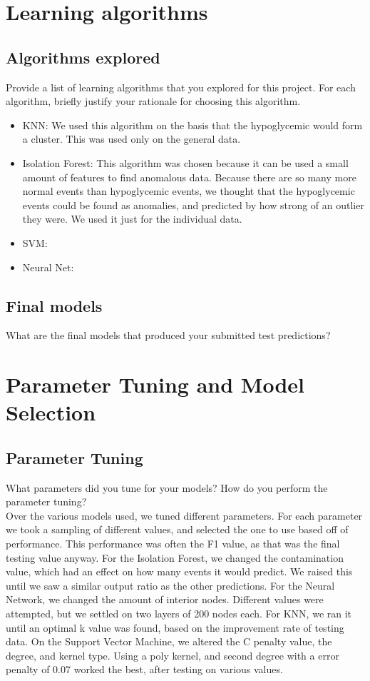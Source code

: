 \documentclass[11pt,a4paper]{article}
\begin{document}
\section{Learning algorithms}
\subsection{Algorithms explored}
Provide a list of learning algorithms that you explored for this project. For each algorithm, briefly justify your rationale for choosing this algorithm.\\
\begin{itemize}
  \item KNN: We used this algorithm on the basis that the hypoglycemic would form a cluster.
  This was used only on the general data.
  \item Isolation Forest: This algorithm was chosen because it can be used a small amount of features to find anomalous data.
  Because there are so many more normal events than hypoglycemic events, we thought that the hypoglycemic events could be found as anomalies, and predicted by how strong of an outlier they were.  We used it just for the individual data.
  \item SVM:
  \item Neural Net:
\end{itemize}

\subsection{Final models}
What are the final models that produced your submitted test predictions?\\

\section{Parameter Tuning and Model Selection }
\subsection{Parameter Tuning}
What parameters did you tune for your models? How do you perform the parameter tuning?\\

Over the various models used, we tuned different parameters.
For each parameter we took a sampling of different values, and selected the one to use based off of performance.
This performance was often the F1 value, as that was the final testing value anyway.
For the Isolation Forest, we changed the contamination value, which had an effect on how many events it would predict.
We raised this until we saw a similar output ratio as the other predictions.
For the Neural Network, we changed the amount of interior nodes.
Different values were attempted, but we settled on two layers of 200 nodes each.
For KNN, we ran it until an optimal k value was found, based on the improvement rate of testing data.
On the Support Vector Machine, we altered the C penalty value, the degree, and kernel type.
Using a poly kernel, and second degree with a error penalty of 0.07 worked the best, after testing on various values.
\end{document}
